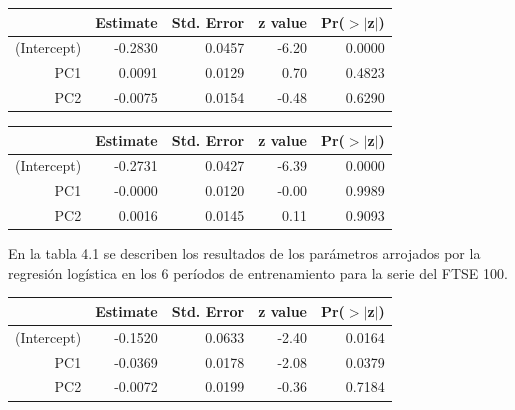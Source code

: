 \documentclass[a4paper,12pt]{Latex/Classes/PhDthesisPSnPDF}
\begin{document}
\newpage
\begin{center}
\begin{table}[ht]
\centering
\begin{tabular}{rrrrr}
  \hline
 & Estimate & Std. Error & z value & Pr($>$$|$z$|$) \\ 
  \hline
(Intercept) & -0.2830 & 0.0457 & -6.20 & 0.0000 \\ 
  PC1 & 0.0091 & 0.0129 & 0.70 & 0.4823 \\ 
  PC2 & -0.0075 & 0.0154 & -0.48 & 0.6290 \\ 
   \hline
\end{tabular}
\end{table}\end{center}
\begin{center}
\begin{table}[ht]
\centering
\begin{tabular}{rrrrr}
  \hline
 & Estimate & Std. Error & z value & Pr($>$$|$z$|$) \\ 
  \hline
(Intercept) & -0.2731 & 0.0427 & -6.39 & 0.0000 \\ 
  PC1 & -0.0000 & 0.0120 & -0.00 & 0.9989 \\ 
  PC2 & 0.0016 & 0.0145 & 0.11 & 0.9093 \\ 
   \hline
\end{tabular}
\end{table}\end{center}



En la tabla 4.1 se describen los resultados de los parámetros arrojados por la regresión logística en los 6 períodos de entrenamiento para la serie del FTSE 100.
\begin{center}
\begin{table}[ht]
\centering
\begin{tabular}{rrrrr}
  \hline
 & Estimate & Std. Error & z value & Pr($>$$|$z$|$) \\ 
  \hline
(Intercept) & -0.1520 & 0.0633 & -2.40 & 0.0164 \\ 
  PC1 & -0.0369 & 0.0178 & -2.08 & 0.0379 \\ 
  PC2 & -0.0072 & 0.0199 & -0.36 & 0.7184 \\ 
   \hline
\end{tabular}
\end{table}\end{center}
\end{document}
